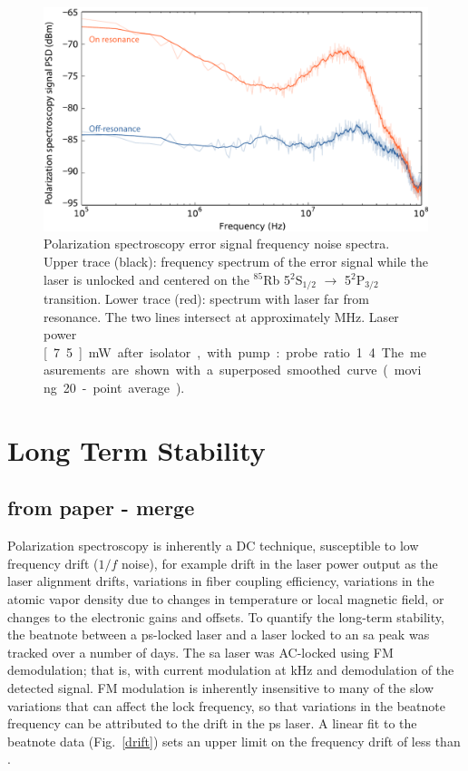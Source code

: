 \begin{figure}[hbp]
    \centering
    \includegraphics[width=\linewidth]{part1/Figs/fig3_v1.pdf}
    \caption{Polarization spectroscopy error signal frequency noise spectra.
Upper trace (black): frequency spectrum of the error signal while the laser is unlocked and centered on the $^{85}$Rb 5$^\text{2}$S$_\text{1/2}$ $\rightarrow$ 5$^\text{2}$P$_\text{3/2}$ transition.
Lower trace (red): spectrum with laser far from resonance.
The two lines intersect at approximately \unit[83]{MHz}.
Laser power \unit[7.5]{mW} after isolator, with pump:probe ratio 1.4.
The measurements are shown with a superposed smoothed curve (moving 20-point average).}
    \label{bandwidth}
\end{figure}

\section{Long Term Stability}
\subsection{from paper - merge}
Polarization spectroscopy is inherently a DC technique, susceptible to low frequency drift ($1/f$ noise), for example drift in the laser power output as the laser alignment drifts, variations in fiber coupling efficiency, variations in the atomic vapor density due to changes in temperature or local magnetic field, or changes to the electronic gains and offsets.
To quantify the long-term stability, the beatnote between a \gls*{ps}-locked laser and a laser locked to an \gls*{sa} peak was tracked over a number of days.
The \gls*{sa} laser was AC-locked using FM demodulation; that is, with current modulation at \unit[250]{kHz} and demodulation of the detected signal.
FM modulation is inherently insensitive to many of the slow variations that can affect the lock frequency, so that variations in the beatnote frequency can be attributed to the drift in the \gls*{ps} laser.
A linear fit to the beatnote data (Fig.~\ref{drift}) sets an upper limit on the frequency drift of less than . 

